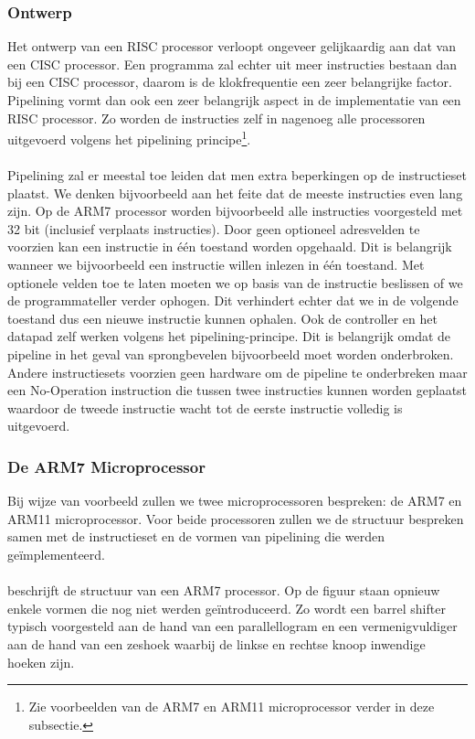 \subsubsection{Ontwerp}
Het ontwerp van een RISC processor verloopt ongeveer gelijkaardig aan dat van een CISC processor. Een programma zal echter uit meer instructies bestaan dan bij een CISC processor, daarom is de klokfrequentie een zeer belangrijke factor. Pipelining vormt dan ook een zeer belangrijk aspect in de implementatie van een RISC processor. Zo worden de instructies zelf in nagenoeg alle processoren uitgevoerd volgens het pipelining principe\footnote{Zie voorbeelden van de ARM7 en ARM11 microprocessor verder in deze subsectie.}.
\paragraph{}
Pipelining zal er meestal toe leiden dat men extra beperkingen op de instructieset plaatst. We denken bijvoorbeeld aan het feite dat de meeste instructies even lang zijn. Op de ARM7 processor worden bijvoorbeeld alle instructies voorgesteld met 32 bit (inclusief verplaats instructies). Door geen optioneel adresvelden te voorzien kan een instructie in \'e\'en toestand worden opgehaald. Dit is belangrijk wanneer we bijvoorbeeld een instructie willen inlezen in \'e\'en toestand. Met optionele velden toe te laten moeten we op basis van de instructie beslissen of we de programmateller verder ophogen. Dit verhindert echter dat we in de volgende toestand dus een nieuwe instructie kunnen ophalen. Ook de controller en het datapad zelf werken volgens het pipelining-principe. Dit is belangrijk omdat de pipeline in het geval van sprongbevelen bijvoorbeeld moet worden onderbroken. Andere instructiesets voorzien geen hardware om de pipeline te onderbreken maar een No-Operation instruction die tussen twee instructies kunnen worden geplaatst waardoor de tweede instructie wacht tot de eerste instructie volledig is uitgevoerd.
\subsubsection{De ARM7 Microprocessor}
Bij wijze van voorbeeld zullen we twee microprocessoren bespreken: de ARM7 en ARM11 microprocessor. Voor beide processoren zullen we de structuur bespreken samen met de instructieset en de vormen van pipelining die werden ge\"implementeerd.
\paragraph{}
 beschrijft de structuur van een ARM7 processor. Op de figuur staan opnieuw enkele vormen die nog niet werden ge\"introduceerd. Zo wordt een barrel shifter typisch voorgesteld aan de hand van een parallellogram en een vermenigvuldiger aan de hand van een zeshoek waarbij de linkse en rechtse knoop inwendige hoeken zijn.
